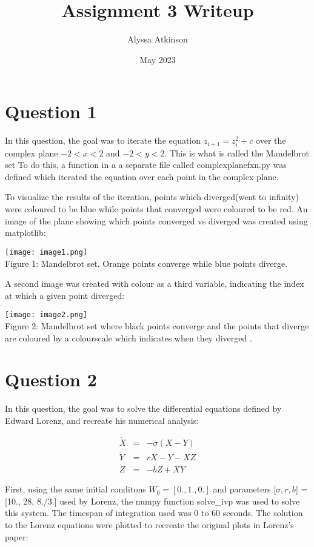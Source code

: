 \documentclass{article}
\title{Assignment 3 Writeup}
\author{Alyssa Atkinson }
\date{May 2023}
\begin{document}
\maketitle{}

\section{Question 1}

In this question, the goal was to iterate the equation $z_{i + 1} = z_i^2 + c$ over the complex plane $-2 < x < 2$ and $-2 < y < 2$. This is what is called the Mandelbrot set To do this, a function in a  a separate file called complexplanefxn.py was defined which iterated the equation over each point in the complex plane. 

\hfill \break
To visualize the results of the iteration, points which diverged(went to infinity) were coloured to be blue while points that converged were coloured to be red. An image of the plane showing which points converged vs diverged was created using matplotlib:


\texttt{[image: image1.png]}
\\\caption{Figure 1: Mandelbrot set. Orange points converge while blue points diverge.}
  \label{fig:fig1}


\hfill \break
A second image was created with colour as a third variable, indicating the index at which a given point diverged: 

\texttt{[image: image2.png]}
\\\caption{Figure 2: Mandelbrot set where black points converge and the points that diverge are coloured by a colourscale which indicates when they diverged .}
  \label{fig:fig2}


\section{Question 2}

{In this question, the goal was to solve the differential equations defined by Edward Lorenz, and recreate his numerical analysis:  }

\begin{eqnarray}
\dot X &=& -\sigma(X-Y)\\
\dot Y &=& rX -Y - XZ\\
\dot Z &=& -bZ + XY
\end{eqnarray}

\hfill \break

First, using the same initial conditons $W_0=[0., 1., 0.]$ and parameters [$\sigma, r, b$] = [10., 28, 8./3.] used by Lorenz, the numpy function  solve\_ivp was used to solve this system. The timespan of integration used was 0 to 60 seconds. The solution to the Lorenz equations were plotted to recreate the original plots in Lorenz's paper: 
\end{document}
